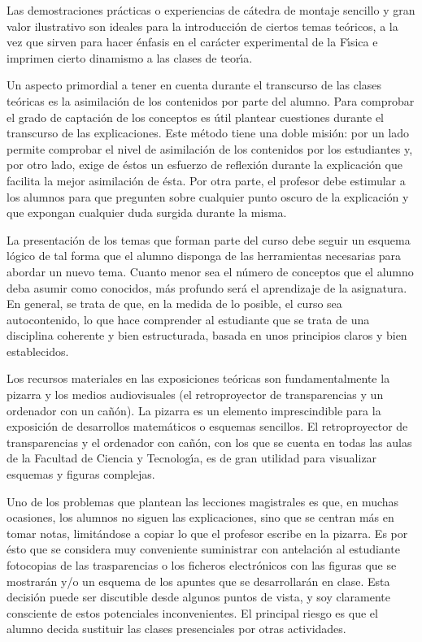 Las demostraciones pr\'{a}cticas o experiencias de c\'{a}tedra de
 montaje sencillo y gran valor ilustrativo son ideales para la 
introducci\'{o}n de ciertos temas te\'{o}ricos,
 a la vez que sirven para hacer \'{e}nfasis en el car\'{a}cter
 experimental de la F\'{\i}sica e imprimen cierto dinamismo a las 
clases de teor\'{\i}a.

Un aspecto primordial a tener en cuenta durante el transcurso de las 
clases te\'{o}ricas es la asimilaci\'{o}n de los contenidos por parte 
del alumno. Para comprobar el grado de captaci\'{o}n de los conceptos 
 es \'{u}til plantear cuestiones durante el transcurso de las 
explicaciones. Este m\'{e}todo tiene una doble misi\'{o}n:
 por un lado permite comprobar el nivel de asimilaci\'{o}n de los
 contenidos por los estudiantes y, por otro lado, exige de \'{e}stos 
un esfuerzo de reflexi\'{o}n durante la explicaci\'{o}n que facilita 
la mejor asimilaci\'{o}n de  \'{e}sta. Por otra parte, el profesor 
debe estimular a los alumnos para que pregunten sobre cualquier punto 
oscuro de la explicaci\'{o}n y que expongan cualquier duda surgida 
durante la misma.

La presentaci\'{o}n de los temas que forman parte del curso debe seguir
 un esquema l\'{o}gico de tal forma que el alumno disponga de las 
herramientas necesarias para abordar un nuevo tema. Cuanto menor 
sea el n\'{u}mero de conceptos que el alumno deba asumir como conocidos,
 m\'{a}s profundo ser\'{a} el aprendizaje de la asignatura. 
En general, se trata de que, en la medida de lo posible, el curso 
sea autocontenido, lo que hace comprender al estudiante que se trata
 de una disciplina coherente y bien estructurada, basada en
 unos principios claros y bien establecidos.

Los recursos materiales en las exposiciones te\'{o}ricas son 
fundamentalmente la pizarra y los medios audiovisuales
(el retroproyector de transparencias y un ordenador con un ca\~{n}\'{o}n).
 La pizarra es un elemento imprescindible para la exposici\'{o}n
 de desarrollos matem\'{a}ticos o esquemas sencillos. 
El retroproyector de transparencias y el ordenador con  ca\~{n}\'{o}n,
 con los que se cuenta en todas las aulas de la Facultad de Ciencia y
 Tecnolog\'{\i}a, es de gran utilidad para visualizar esquemas
 y figuras complejas. 

Uno de los problemas que plantean las lecciones magistrales es que, en muchas 
ocasiones, los alumnos no siguen las explicaciones, sino que se centran
m\'{a}s en tomar notas, limit\'{a}ndose a copiar lo que el profesor
escribe en la pizarra.
Es por \'{e}sto que se considera  muy conveniente suministrar con
 antelaci\'{o}n al estudiante 
fotocopias de
 las trasparencias o los ficheros electr\'{o}nicos
 con las figuras que se mostrar\'{a}n y/o  un esquema de los apuntes que se 
desarrollar\'{a}n en clase.
Esta decisi\'{o}n puede ser discutible desde algunos puntos de vista,
y soy claramente consciente de estos potenciales inconvenientes. 
El principal riesgo es que el alumno decida sustituir 
las clases presenciales por otras actividades.

